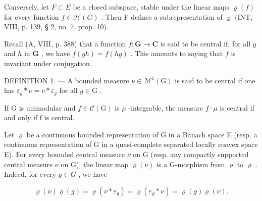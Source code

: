 Conversely, let \(F \subset E\) be a closed subspace, stable under the linear maps \(\varrho(f)\) for every function \(f \in \mathcal{H}(G)\) . Then F defines a subrepresentation of \(\varrho\) (INT, VIII, p. 139, § 2, no. 7, prop. 10).

Recall (A, VIII, p. 388) that a function \(f \colon \mathbf{G} \to \mathbf{C}\) is said to be central if, for all \(g\) and \(h\) in \(\mathbf{G}\) , we have \(f(gh) = f(hg)\) . This amounts to saying that \(f\) is invariant under conjugation.

DEFINITION 1. --- A bounded measure \(\nu \in \mathcal{M}^{1}(\mathrm{G})\) is said to be central if one has \(\varepsilon_{g} * \nu = \nu * \varepsilon_{g}\) for all \(g \in \mathrm{G}\) .

If G is unimodular and \(f \in \mathcal{C}(\mathrm{G})\) is \(\mu\) -integrable, the measure \(f \cdot \mu\) is central if and only if f is central.

Let \(\varrho\) be a continuous bounded representation of G in a Banach space E (resp. a continuous representation of G in a quasi-complete separated locally convex space E). For every bounded central measure \(\nu\) on G (resp. any compactly supported central measure \(\nu\) on G), the linear map \(\varrho(\nu)\) is a G-morphism from \(\varrho\) to \(\varrho\) . Indeed, for every \(g \in G\) , we have

\[
\varrho (\nu) \varrho (g) = \varrho (\nu * \varepsilon_ {g}) = \varrho (\varepsilon_ {g} * \nu) = \varrho (g) \varrho (\nu).
\]

